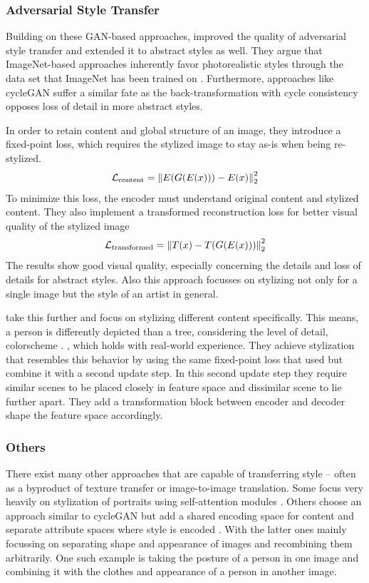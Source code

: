 \subsubsection{Adversarial Style Transfer}
Building on these GAN-based approaches, \citeauthor*{artsiom} improved the quality of adversarial style transfer and extended it to abstract styles as well.
They argue that ImageNet-based approaches inherently favor photorealistic styles through the data set that ImageNet has been trained on \cite{artsiom}.
Furthermore, approaches like cycleGAN suffer a similar fate as the back-transformation with cycle consistency opposes loss of detail in more abstract styles.

In order to retain content and global structure of an image, they introduce a fixed-point loss, which requires the stylized image to stay as-is when being re-stylized.
\begin{align}
    \mathcal{L}_{\text{content}} = \left\lVert E(G(E(x))) - E(x)\right\rVert^2_2
\end{align}
To minimize this loss, the encoder must understand original content and stylized content.
They also implement a transformed reconstruction loss for better visual quality of the stylized image
\begin{align}
    \mathcal{L}_{\text{transformed}} = \left\lVert T(x) - T(G(E(x)))\right\rVert^2_2
\end{align}
The results show good visual quality, especially concerning the details and loss of details for abstract styles.
Also this approach focusses on stylizing not only for a single image but the style of an artist in general.

\citeauthor*{dima} take this further and focus on stylizing different content specifically.
This means, a person is differently depicted than a tree, considering the level of detail, colorscheme \etc. , which holds with real-world experience.
They achieve stylization that resembles this behavior by using the same fixed-point loss that \citeauthor*{artsiom} used but combine it with a second update step.
In this second update step they require similar scenes to be placed closely in feature space and dissimilar scene to lie further apart.
They add a transformation block between encoder and decoder shape the feature space accordingly.

\subsubsection{Others}
There exist many other approaches that are capable of transferring style -- often as a byproduct of texture transfer or image-to-image translation.
Some focus very heavily on stylization of portraits using self-attention modules \cite{ugatit}.
Others choose an approach similar to cycleGAN but add a shared encoding space for content and separate attribute spaces where style is encoded \cite{unit, munit, drit, drit++}.
With the latter ones mainly focussing on separating shape and appearance of images and recombining them arbitrarily.
One such example is taking the posture of a person in one image and combining it with the clothes and appearance of a person in another image.


